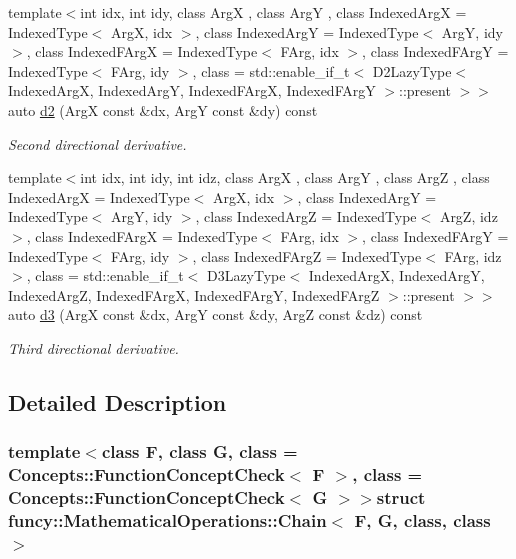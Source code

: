 \begin{DoxyCompactItemize}
{\footnotesize template$<$int idx, int idy, class Arg\-X , class Arg\-Y , class Indexed\-Arg\-X  = Indexed\-Type$<$ Arg\-X, idx $>$, class Indexed\-Arg\-Y  = Indexed\-Type$<$ Arg\-Y, idy $>$, class Indexed\-F\-Arg\-X  = Indexed\-Type$<$ F\-Arg, idx $>$, class Indexed\-F\-Arg\-Y  = Indexed\-Type$<$ F\-Arg, idy $>$, class  = std\-::enable\-\_\-if\-\_\-t$<$ D2\-Lazy\-Type$<$ Indexed\-Arg\-X, Indexed\-Arg\-Y, Indexed\-F\-Arg\-X,                                                             Indexed\-F\-Arg\-Y $>$\-::present $>$$>$ }\\auto \hyperlink{structfuncy_1_1MathematicalOperations_1_1Chain_a2f9fc8501bc49d4047463cc52916502f}{d2} (Arg\-X const \&dx, Arg\-Y const \&dy) const 
\begin{DoxyCompactList}\small\item\em Second directional derivative. \end{DoxyCompactList}\item 
{\footnotesize template$<$int idx, int idy, int idz, class Arg\-X , class Arg\-Y , class Arg\-Z , class Indexed\-Arg\-X  = Indexed\-Type$<$ Arg\-X, idx $>$, class Indexed\-Arg\-Y  = Indexed\-Type$<$ Arg\-Y, idy $>$, class Indexed\-Arg\-Z  = Indexed\-Type$<$ Arg\-Z, idz $>$, class Indexed\-F\-Arg\-X  = Indexed\-Type$<$ F\-Arg, idx $>$, class Indexed\-F\-Arg\-Y  = Indexed\-Type$<$ F\-Arg, idy $>$, class Indexed\-F\-Arg\-Z  = Indexed\-Type$<$ F\-Arg, idz $>$, class  = std\-::enable\-\_\-if\-\_\-t$<$                           D3\-Lazy\-Type$<$ Indexed\-Arg\-X, Indexed\-Arg\-Y, Indexed\-Arg\-Z, Indexed\-F\-Arg\-X,                                       Indexed\-F\-Arg\-Y, Indexed\-F\-Arg\-Z $>$\-::present $>$$>$ }\\auto \hyperlink{structfuncy_1_1MathematicalOperations_1_1Chain_a6c57d7ff1683869b10b6d1e69f32601b}{d3} (Arg\-X const \&dx, Arg\-Y const \&dy, Arg\-Z const \&dz) const 
\begin{DoxyCompactList}\small\item\em Third directional derivative. \end{DoxyCompactList}\end{DoxyCompactItemize}


\subsection{Detailed Description}
\subsubsection*{template$<$class F, class G, class = Concepts\-::\-Function\-Concept\-Check$<$ F $>$, class = Concepts\-::\-Function\-Concept\-Check$<$ G $>$$>$struct funcy\-::\-Mathematical\-Operations\-::\-Chain$<$ F, G, class, class $>$}


